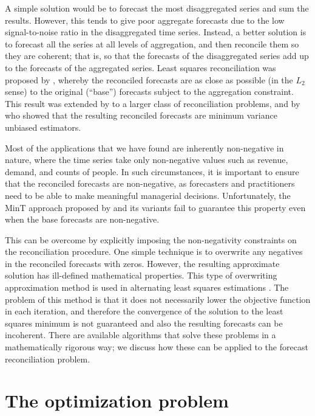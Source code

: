 \documentclass[twocolumn]{svjour3}
\begin{document}
A simple solution would be to forecast the most disaggregated series and sum the results. However, this tends to give poor aggregate forecasts due to the low signal-to-noise ratio in the disaggregated time series. Instead, a better solution is to forecast all the series at all levels of aggregation, and then reconcile them so they are coherent; that is, so that the forecasts of the disaggregated series add up to the forecasts of the aggregated series. Least squares reconciliation was proposed by \citet{Hyndman2011}, whereby the reconciled forecasts are as close as possible (in the $L_2$ sense) to the original (``base'') forecasts subject to the aggregation constraint. This result was extended by \citet{Hyndman2016} to a larger class of reconciliation problems, and by \citet{Wick2018} who showed that the resulting reconciled forecasts are minimum variance unbiased estimators.

Most of the applications that we have found are inherently non-negative in nature, where the time series take only non-negative values such as revenue, demand, and counts of people. In such circumstances, it is important to ensure that the reconciled forecasts are non-negative, as forecasters and practitioners need to be able to make meaningful managerial decisions. Unfortunately, the MinT approach proposed by \citet{Wick2018} and its variants fail to guarantee this property even when the base forecasts are non-negative.

This can be overcome by explicitly imposing the non-negativity constraints on the reconciliation procedure. One simple technique is to overwrite any negatives in the reconciled forecasts with zeros. However, the resulting approximate solution has ill-defined mathematical properties. This type of overwriting approximation method is used in alternating least squares estimations \citep{Berry2007, Karjalainen1991}. The problem of this method is that it does not necessarily lower the objective function in each iteration, and therefore the convergence of the solution to the least squares minimum is not guaranteed and {\color{red} also the resulting forecasts can be incoherent.} There are available algorithms that solve these problems in a mathematically rigorous way; we discuss how these can be applied to the forecast reconciliation problem.

\section{The optimization problem}
\end{document}
